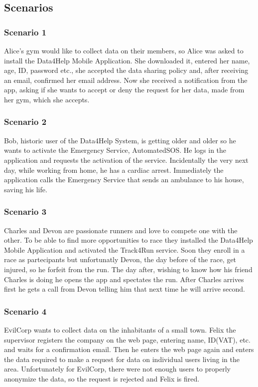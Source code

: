 \subsection{Scenarios}
\subsubsection{Scenario 1}
Alice's gym would like to collect data on their members, so Alice was asked to install the Data4Help Mobile Application. She downloaded it, entered her name, age, ID, password etc., she accepted the data sharing policy and, after receiving an email, confirmed her email address. Now she received a notification from the app, asking if she wants to accept or deny the request for her data, made from her gym, which she accepts.
\subsubsection{Scenario 2}
Bob, historic user of the Data4Help System, is getting older and older so he wants to activate the Emergency Service, AutomatedSOS. He logs in the application and requests the activation of the service.
Incidentally the very next day, while working from home, he has a cardiac arrest. Immediately the application calls the Emergency Service that sends an ambulance to his house, saving his life.
\subsubsection{Scenario 3}
Charles and Devon are passionate runners and love to compete one with the other. To be able to find more opportunities to race they installed the Data4Help Mobile Application and activated the Track4Run service. Soon they enroll in a race as partecipants but unfortunatly Devon, the day before of the race, get injured, so he forfeit from the run. The day after, wishing to know how his friend Charles is doing he opens the app and spectates the run. After Charles arrives first he gets a call from Devon telling him that next time he will arrive second.
\subsubsection{Scenario 4}
EvilCorp wants to collect data on the inhabitants of a small town. Felix the supervisor registers the company on the web page, entering name, ID(VAT), etc. and waits for a confirmation email. Then he enters the web page again and enters the data required to make a request for data on individual users living in the area. Unfortunately for EvilCorp, there were not enough users to properly anonymize the data, so the request is rejected and Felix is fired.
